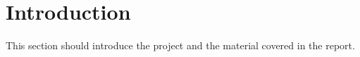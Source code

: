 \section{Introduction}

This section should introduce the project and the material covered in the report. 
